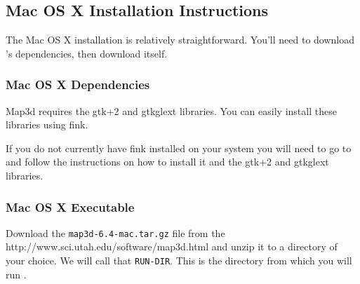 \subsection{Mac OS X Installation Instructions}
\label{sec:mac-install}

The Mac OS X installation is relatively straightforward.  You'll need to 
download \map{}'s dependencies, then download \map{} itself.

\subsubsection{Mac OS X Dependencies}

Map3d requires the gtk+2 and gtkglext libraries.  You can easily
install these libraries using fink.

If you do not currently have fink installed on your system you will
need to go to  and
follow the instructions on how to install it and the gtk+2 and
gtkglext libraries.

\subsubsection{Mac OS X Executable}

Download the \texttt{map3d-6.4-mac.tar.gz} file from the \map{}
{http://www.sci.utah.edu/software/map3d.html}
and unzip it to a directory of your choice.  We will call that
\texttt{RUN-DIR}. This is the directory from which you will run \map{}.





